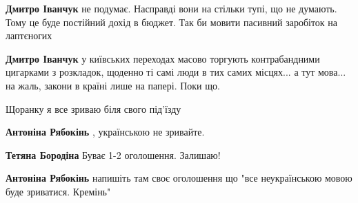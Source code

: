 \begin{itemize}
\begin{itemize}
\textbf{Дмитро Іванчук} не подумає. Насправді вони на стільки тупі, що не думають. Тому це буде постійний дохід в бюджет.
Так би мовити пасивний заробіток на лаптєногих\Smiley[1.0][yellow]

 
\textbf{Дмитро Іванчук} у київських переходах масово торгують контрабандними
цигарками з розкладок, щоденно ті самі люди в тих самих місцях... а тут мова... на
жаль, закони в країні лише на папері. Поки що.
\end{itemize}

 
Щоранку я все зриваю біля свого під'їзду

\begin{itemize}
 
\textbf{Антоніна Рябокінь} , українською не зривайте.

\begin{itemize}
 
\textbf{Тетяна Бородіна} Буває 1-2 оголошення. Залишаю!
\end{itemize}

 
\textbf{Антоніна Рябокінь} напишіть там своє оголошення що "все неукраїнською мовою буде зриватися. Кремінь"


\end{itemize}
\end{itemize}
